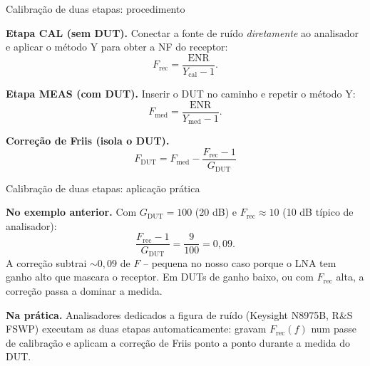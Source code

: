 
\begin{frame}{Calibração de duas etapas: procedimento}

\textbf{Etapa CAL (sem DUT).} Conectar a fonte de ruído \emph{diretamente} ao analisador e aplicar o método Y para obter a NF do receptor:
\[
F_{\text{rec}} = \frac{\text{ENR}}{Y_{\text{cal}} - 1}.
\]

\textbf{Etapa MEAS (com DUT).} Inserir o DUT no caminho e repetir o método Y:
\[
F_{\text{med}} = \frac{\text{ENR}}{Y_{\text{med}} - 1}.
\]

\textbf{Correção de Friis (isola o DUT).}
\[
\boxed{\;F_{\text{DUT}} = F_{\text{med}} - \frac{F_{\text{rec}} - 1}{G_{\text{DUT}}}\;}
\]

\end{frame}


\begin{frame}{Calibração de duas etapas: aplicação prática}

\textbf{No exemplo anterior.} Com $G_{\text{DUT}} = 100$ (20 dB) e $F_{\text{rec}} \approx 10$ (10 dB típico de analisador):
\[
\frac{F_{\text{rec}} - 1}{G_{\text{DUT}}} = \frac{9}{100} = 0{,}09.
\]
A correção subtrai $\sim 0{,}09$ de $F$ -- pequena no nosso caso porque o LNA tem ganho alto que mascara o receptor. Em DUTs de ganho baixo, ou com $F_{\text{rec}}$ alta, a correção passa a dominar a medida.

\vspace{0.3cm}

\textbf{Na prática.} Analisadores dedicados a figura de ruído (Keysight N8975B, R\&S FSWP) executam as duas etapas automaticamente: gravam $F_{\text{rec}}(f)$ num passe de calibração e aplicam a correção de Friis ponto a ponto durante a medida do DUT.

\end{frame}



